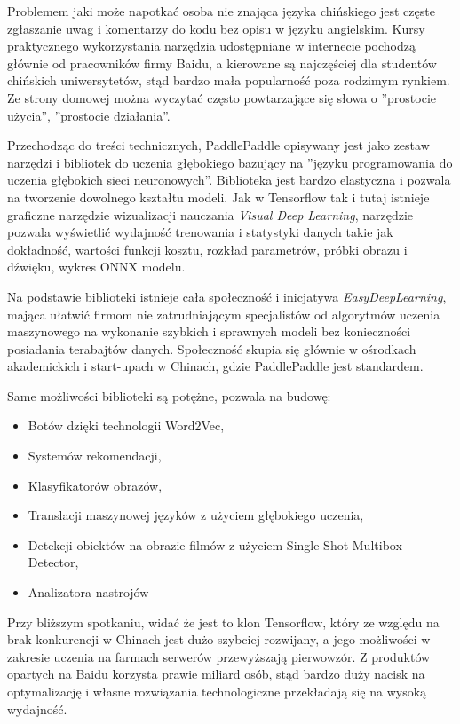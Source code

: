 \documentclass[12pt,a4paper,twoside,titlepage,openright]{book}
\begin{document}
Problemem jaki może napotkać osoba nie znająca języka chińskiego jest częste zgłaszanie uwag i komentarzy do kodu bez opisu w języku angielskim. Kursy praktycznego wykorzystania narzędzia udostępniane w internecie pochodzą głównie od pracowników firmy Baidu, a kierowane są najczęściej dla studentów chińskich uniwersytetów, stąd bardzo mała popularność poza rodzimym rynkiem. Ze strony domowej można wyczytać często powtarzające się słowa o ''prostocie użycia'', ''prostocie działania''. 

Przechodząc do treści technicznych, PaddlePaddle opisywany jest jako zestaw narzędzi i bibliotek do uczenia głębokiego bazujący na ''języku programowania do uczenia głębokich sieci neuronowych''. Biblioteka jest bardzo elastyczna i pozwala na tworzenie dowolnego kształtu modeli. Jak w Tensorflow tak i tutaj istnieje graficzne narzędzie wizualizacji nauczania \textit{Visual Deep Learning}, narzędzie pozwala wyświetlić wydajność trenowania i statystyki danych takie jak dokładność, wartości funkcji kosztu, rozkład parametrów, próbki obrazu i dźwięku, wykres ONNX modelu.

Na podstawie biblioteki istnieje cała społeczność i inicjatywa \textit{EasyDeepLearning}, mająca ułatwić firmom nie zatrudniającym specjalistów od algorytmów uczenia maszynowego na wykonanie szybkich i sprawnych modeli bez konieczności posiadania terabajtów danych. Społeczność skupia się głównie w ośrodkach akademickich i start-upach w Chinach, gdzie PaddlePaddle jest standardem.

Same możliwości biblioteki są potężne, pozwala na budowę:
\begin{itemize}
\item Botów dzięki technologii Word2Vec,
\item Systemów rekomendacji,
\item Klasyfikatorów obrazów,
\item Translacji maszynowej języków z użyciem głębokiego uczenia,
\item Detekcji obiektów na obrazie filmów z użyciem Single Shot Multibox Detector,
\item Analizatora nastrojów
\end{itemize}

Przy bliższym spotkaniu, widać że jest to klon Tensorflow, który ze względu na brak konkurencji w Chinach jest dużo szybciej rozwijany, a jego możliwości w zakresie uczenia na farmach serwerów przewyższają pierwowzór. Z produktów opartych na Baidu korzysta prawie miliard osób, stąd bardzo duży nacisk na optymalizację i własne rozwiązania technologiczne przekładają się na wysoką wydajność.
\end{document}
